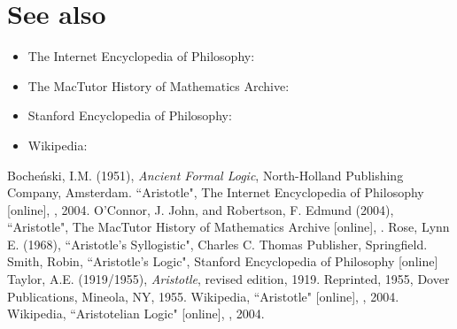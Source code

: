 \documentclass[12pt]{article}
\begin{document}
\section*{See also}

\begin{itemize}
\item
The Internet Encyclopedia of Philosophy: 
\item
The MacTutor History of Mathematics Archive: 
\item
Stanford Encyclopedia of Philosophy: 
\item
Wikipedia: 
\end{itemize}

\begin{thebibliography}{99}
 Boche\'nski, I.M. (1951), \textit{Ancient Formal Logic}, North-Holland Publishing Company, Amsterdam.
 ``Aristotle", The Internet Encyclopedia of Philosophy [online],  , 2004.
 O'Connor, J. John, and Robertson, F. Edmund (2004), ``Aristotle", The MacTutor History of Mathematics Archive [online], .
 Rose, Lynn E. (1968), ``Aristotle's Syllogistic", Charles C. Thomas Publisher, Springfield. 
 Smith, Robin, ``Aristotle's Logic", Stanford Encyclopedia of Philosophy [online] 
 Taylor, A.E. (1919/1955), \textit{Aristotle}, revised edition, 1919.  Reprinted, 1955, Dover Publications, Mineola, NY, 1955.
 Wikipedia, ``Aristotle" [online], , 2004.
 Wikipedia, ``Aristotelian Logic" [online],  , 2004.
\end{thebibliography}

\end{document}
